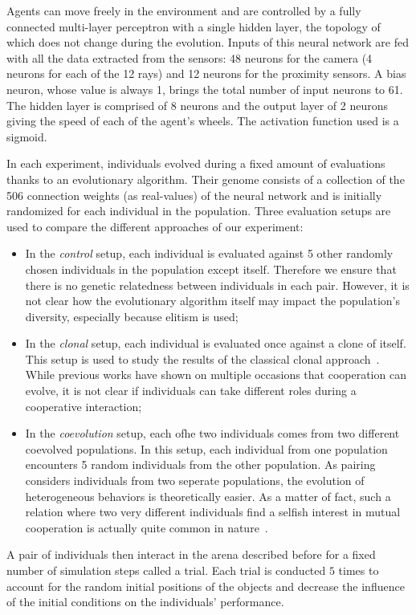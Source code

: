   Agents can move freely in the environment and are controlled by a fully connected multi-layer perceptron with a single hidden layer, the topology of which does not change during the evolution. Inputs of this neural network are fed with all the data extracted from the sensors: 48 neurons for the camera (4 neurons for each of the 12 rays) and 12 neurons for the proximity sensors. A bias neuron, whose value is always 1, brings the total number of input neurons to 61. The hidden layer is comprised of 8 neurons and the output layer of 2 neurons giving the speed of each of the agent's wheels. The activation function used is a sigmoid.

  In each experiment, individuals evolved during a fixed amount of evaluations thanks to an evolutionary algorithm. Their genome consists of a collection of the 506 connection weights (as real-values) of the neural network and is initially randomized for each individual in the population. Three evaluation setups are used to compare the different approaches of our experiment: 

  \begin{itemize}
    \item{In the \emph{control} setup, each individual is evaluated against 5 other randomly chosen individuals in the population except itself. Therefore we ensure that there is no genetic relatedness between individuals in each pair. However, it is not clear how the evolutionary algorithm itself may impact the population's diversity, especially because elitism is used;}
    \item{In the \emph{clonal} setup, each individual is evaluated once against a clone of itself. This setup is used to study the results of the classical clonal approach~\cite{Waibel2009, Hauert2014, Trianni2007, Lichocki2012}. While previous works have shown on multiple occasions that cooperation can evolve, it is not clear if individuals can take different roles during a cooperative interaction;}
    \item{In the \emph{coevolution} setup, each ofhe two individuals comes from two different coevolved populations. In this setup, each individual from one population encounters 5 random individuals from the other population. As pairing considers individuals from two seperate populations, the evolution of heterogeneous behaviors is theoretically easier. As a matter of fact, such a relation where two very different individuals find a selfish   interest in mutual cooperation is actually quite common in nature~\cite{Connor1995}.}
  \end{itemize}
 A pair of individuals then interact in the arena described before for a fixed number of simulation steps called a trial. Each trial is conducted $5$ times to account for the random initial positions of the objects and decrease the influence of the initial conditions on the individuals' performance. 
  
